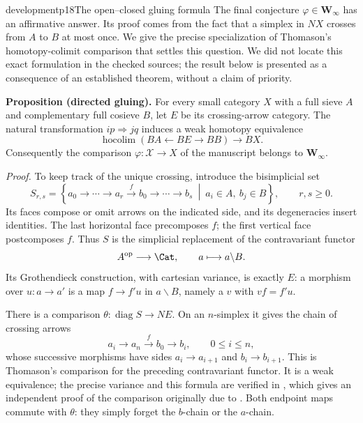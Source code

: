 \begin{dcomment}{development}{p18}{The open--closed gluing formula}
The final conjecture $\varphi\in\mathbf W_\infty$ has an affirmative answer. Its proof comes from the fact that a simplex in $NX$ crosses from $A$ to $B$ at most once. We give the precise specialization of Thomason's homotopy-colimit comparison that settles this question. We did not locate this exact formulation in the checked sources; the result below is presented as a consequence of an established theorem, without a claim of priority.

\textbf{Proposition (directed gluing).}\ours
For every small category $X$ with a full sieve $A$ and complementary full cosieve $B$, let $E$ be its crossing-arrow category. The natural transformation $ip\Rightarrow jq$ induces a weak homotopy equivalence
\[
 \operatorname{hocolim}(BA\longleftarrow BE\longrightarrow BB)
 \longrightarrow BX.
\]
Consequently the comparison $\varphi:\mathcal X\to X$ of the manuscript belongs to $\mathbf W_\infty$.

\emph{Proof.} To keep track of the unique crossing, introduce the bisimplicial set
\[
 S_{r,s}=\left\{
 a_0\longrightarrow\cdots\longrightarrow a_r
 \xrightarrow{f}b_0\longrightarrow\cdots\longrightarrow b_s
 \ \middle|\ a_i\in A,\ b_j\in B
 \right\},\qquad r,s\geq0.
\]
Its faces compose or omit arrows on the indicated side, and its degeneracies insert identities. The last horizontal face precomposes $f$; the first vertical face postcomposes $f$. Thus $S$ is the simplicial replacement of the contravariant functor
\[
 A^{\mathrm{op}}\longrightarrow\Cat,\qquad
 a\longmapsto a\backslash B.
\]
Its Grothendieck construction, with cartesian variance, is exactly $E$: a morphism over $u:a\to a'$ is a map $f\to f'u$ in $a\backslash B$, namely a $v$ with $vf=f'u$.

There is a comparison $\theta:\operatorname{diag}S\to NE$. On an $n$-simplex it gives the chain of crossing arrows
\[
 a_i\longrightarrow a_n\xrightarrow{f}b_0
 \longrightarrow b_i,\qquad 0\leq i\leq n,
\]
whose successive morphisms have sides $a_i\to a_{i+1}$ and $b_i\to b_{i+1}$. This is Thomason's comparison for the preceding contravariant functor. It is a weak equivalence; the precise variance and this formula are verified in \citet[\S3.1, equation~(9), and Theorem~3]{Cegarra2020}, which gives an independent proof of the comparison originally due to \citet[Theorem~1.2]{Thomason1979}. Both endpoint maps commute with $\theta$: they simply forget the $b$-chain or the $a$-chain.


\end{dcomment}
